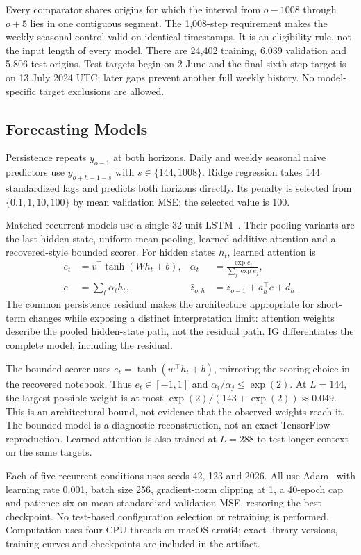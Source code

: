 \documentclass[conference]{IEEEtran}
\begin{document}
Every comparator shares origins for which the interval from $o-1008$ through $o+5$ lies in one contiguous segment. The 1,008-step requirement makes the weekly seasonal control valid on identical timestamps. It is an eligibility rule, not the input length of every model. There are 24,402 training, 6,039 validation and 5,806 test origins. Test targets begin on 2 June and the final sixth-step target is on 13 July 2024 UTC; later gaps prevent another full weekly history. No model-specific target exclusions are allowed.

\subsection{Forecasting Models}
Persistence repeats $y_{o-1}$ at both horizons. Daily and weekly seasonal naive predictors use $y_{o+h-1-s}$ with $s\in\{144,1008\}$. Ridge regression takes 144 standardized lags and predicts both horizons directly. Its penalty is selected from $\{0.1,1,10,100\}$ by mean validation MSE; the selected value is 100.

Matched recurrent models use a single 32-unit LSTM~\cite{lstm}. Their pooling variants are the last hidden state, uniform mean pooling, learned additive attention and a recovered-style bounded scorer. For hidden states $h_t$, learned attention is
\begin{align}
 e_t&=v^\top\tanh(Wh_t+b), &
 \alpha_t&=\frac{\exp e_t}{\sum_j\exp e_j},\\
 c&=\sum_t\alpha_t h_t, &
 \hat{z}_{o,h}&=z_{o-1}+a_h^\top c+d_h.
\end{align}
The common persistence residual makes the architecture appropriate for short-term changes while exposing a distinct interpretation limit: attention weights describe the pooled hidden-state path, not the residual path. IG differentiates the complete model, including the residual.

The bounded scorer uses $e_t=\tanh(w^\top h_t+b)$, mirroring the scoring choice in the recovered notebook. Thus $e_t\in[-1,1]$ and $\alpha_i/\alpha_j\leq\exp(2)$. At $L=144$, the largest possible weight is at most $\exp(2)/(143+\exp(2))\approx0.049$. This is an architectural bound, not evidence that the observed weights reach it. The bounded model is a diagnostic reconstruction, not an exact TensorFlow reproduction. Learned attention is also trained at $L=288$ to test longer context on the same targets.

Each of five recurrent conditions uses seeds 42, 123 and 2026. All use Adam~\cite{adam} with learning rate 0.001, batch size 256, gradient-norm clipping at 1, a 40-epoch cap and patience six on mean standardized validation MSE, restoring the best checkpoint. No test-based configuration selection or retraining is performed. Computation uses four CPU threads on macOS arm64; exact library versions, training curves and checkpoints are included in the artifact.
\end{document}
